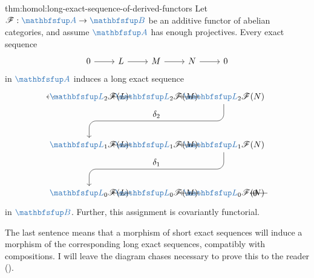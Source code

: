 \begin{thm}{}{thm:homol:long-exact-sequence-of-derived-functors}
  Let $\mathscr{F} : \categ{A} \to \categ{B}$ be an additive functor
  of abelian categories, and assume $\categ{A}$ has enough
  projectives. Every exact sequence
  \[\begin{tikzcd}
      0 \arrow[r] & L \arrow[r] & M \arrow[r] & N \arrow[r] & 0
    \end{tikzcd}\] in $\categ{A}$ induces a long exact sequence
  \[
    \begin{tikzpicture}[baseline=(current bounding box.center)]
      \node (dots) at (-1.3,4)
      {$\dots$}; \node (L2L) at (0,4)
      {$\categ{L}_2\mathscr{F}(L)$}; \node (L2M) at (2.8,4)
      {$\categ{L}_2\mathscr{F}(M)$}; \node (L2N) at (5.6,4)
      {$\categ{L}_2\mathscr{F}(N)$}; \node (L1L) at (0,2)
      {$\categ{L}_1\mathscr{F}(L)$}; \node (L1M) at (2.8,2)
      {$\categ{L}_1\mathscr{F}(M)$}; \node (L1N) at (5.6,2)
      {$\categ{L}_1\mathscr{F}(N)$}; \node (L0L) at (0,0)
      {$\categ{L}_0\mathscr{F}(L)$}; \node (L0M) at (2.8,0)
      {$\categ{L}_0\mathscr{F}(M)$}; \node (L0N) at (5.6,0)
      {$\categ{L}_0\mathscr{F}(N)$}; \node (zero) at (6.9,0)
      {$0$}; \draw[->] (dots) -- (L2L); \draw[->] (L2L) -- (L2M);
      \draw[->] (L2M) -- (L2N); \draw[->] (L1L) -- (L1M); \draw[->]
      (L1M) -- (L1N); \draw[->] (L0L) -- (L0M); \draw[->] (L0M) --
      (L0N); \draw[->] (L0N) -- (zero); \draw[->, rounded corners=8pt]
      (L2N.south) -- (5.6,3) -- node[above]
      {$\delta_2$} (0,3) -- (L1L.north); \draw[->, rounded
      corners=8pt] (L1N.south) -- (5.6,1) -- node[above]
      {$\delta_1$} (0,1) -- (L0L.north);
    \end{tikzpicture}
  \]
  in $\categ{B}$. Further, this assignment is covariantly functorial.
\end{thm}

The last sentence means that a morphism of short exact sequences will
induce a morphism of the corresponding long exact sequences,
compatibly with compositions. I will leave the diagram chases
necessary to prove this to the reader
().

